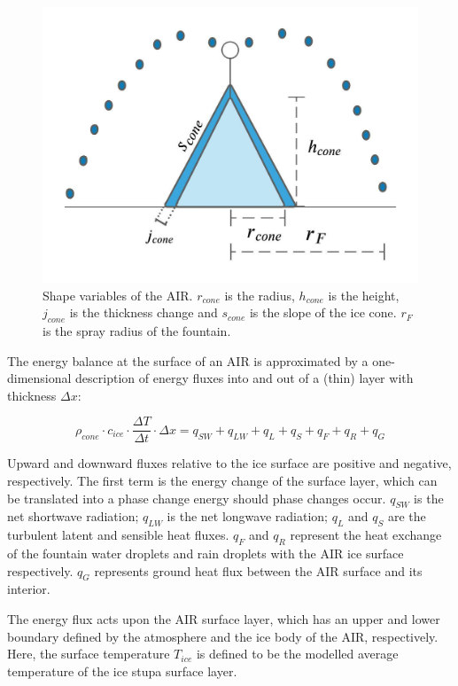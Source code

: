 \begin{figure}
	\begin{center}
		\includegraphics[width=10 cm]{figs/AIR_schematic.jpeg}
	\end{center}
	\caption{Shape variables of the AIR. $r_{cone}$ is the radius, $h_{cone}$ is the height, $j_{cone}$ is the
		thickness change and $s_{cone}$ is the slope of the ice cone. $r_F$ is the spray radius of the fountain.}
	\label{fig:shape}
\end{figure}

The energy balance at the surface of an AIR is approximated by a one-dimensional description of energy fluxes
into and out of a (thin) layer with thickness $\Delta x$:

\begin{equation}
	\rho_{cone} \cdot c_{ice} \cdot \frac{\Delta T}{\Delta t} \cdot \Delta x = q_{SW} + q_{LW} + q_{L} + q_{S} + q_{F}+ q_{R} + q_{G}
	\label{eqn:EB}
\end{equation}

Upward and downward fluxes relative to the ice surface are positive and negative, respectively. The first term
is the energy change of the surface layer, which can be translated into a phase change energy should phase
changes occur. $q_{SW}$ is the net shortwave radiation; $q_{LW}$ is the net longwave radiation; $q_{L}$ and
$q_{S}$ are the turbulent latent and sensible heat fluxes. $q_{F}$ and $q_{R}$ represent the heat exchange of
the fountain water droplets and rain droplets with the AIR ice surface respectively. $q_{G}$ represents ground
heat flux between the AIR surface and its interior.

The energy flux acts upon the AIR surface layer, which has an upper and lower boundary defined by the atmosphere
and the ice body of the AIR, respectively. Here, the surface temperature $T_{ice}$ is defined to be the modelled
average temperature of the ice stupa surface layer.

